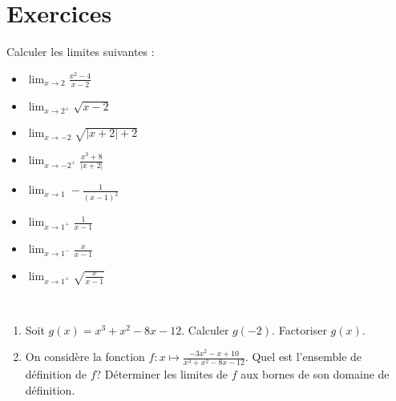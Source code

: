 

























\TCDLessonStyleOff
\clearpage
\section{Exercices}
      \begin{exo}
      Calculer les limites suivantes : \\
            \begin{itemize}
                  \item $\lim_{x\rightarrow 2}\frac{x^2 - 4}{x-2}$
                  \item $\lim_{x\rightarrow 2^+} \sqrt{x-2}$
                  \item $\lim_{x\rightarrow -2} \sqrt{|x+2| + 2} $
                  \item $\lim_{x\rightarrow-2^+} \frac{x^3 + 8}{|x+2|} $
                  \item $ \lim_{x\rightarrow 1} -\frac{1}{(x-1)^2} $
                  \item $ \lim_{x\rightarrow 1^+} \frac{1}{x-1} $
                  \item $ \lim_{x\rightarrow 1^-} \frac{x}{x-1} $
                  \item $ \lim_{x\rightarrow 1^+} \sqrt{\frac{x}{x-1}} $
            \end{itemize}
      \end{exo}
%
      \begin{exo}~\\
            \begin{enumerate}
                  \item Soit $g(x) = x^3 + x^2 - 8 x - 12$.
                        Calculer $g(-2)$. Factoriser $g(x)$.
                  \item On consid\`ere la fonction $f : x \mapsto \frac{-3x^2-x+10}{x^3+x^2-8x-12}$.
                        Quel est l'ensemble de d\'efinition de $f$?
                        D\'eterminer les limites de $f$ aux bornes de son domaine de d\'efinition.
            \end{enumerate}
      \end{exo}
